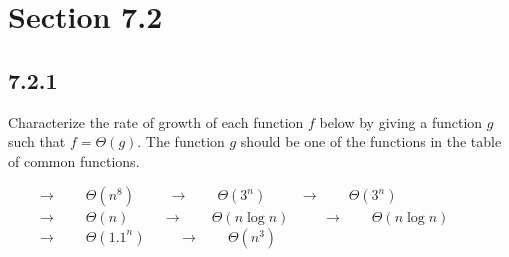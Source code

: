 





\section*{Section 7.2}

\subsection*{7.2.1}
Characterize the rate of growth of each function $f$ below by giving a function $g$ such that $f = \Theta(g)$. The function $g$ should be one of the functions in the table of common functions.
\begin{enumerate}
   $\qquad \rightarrow \qquad \Theta(n^8)$
   $\qquad \rightarrow \qquad \Theta(3^n)$
   $\qquad \rightarrow \qquad \Theta(3^n)$
   $\qquad \rightarrow \qquad \Theta(n)$
   $\qquad \rightarrow \qquad \Theta(n\log n)$
   $\qquad \rightarrow \qquad \Theta(n\log n)$
   $\qquad \rightarrow \qquad \Theta(1.1^n)$
   $\qquad \rightarrow \qquad \Theta(n^3)$
\end{enumerate}

